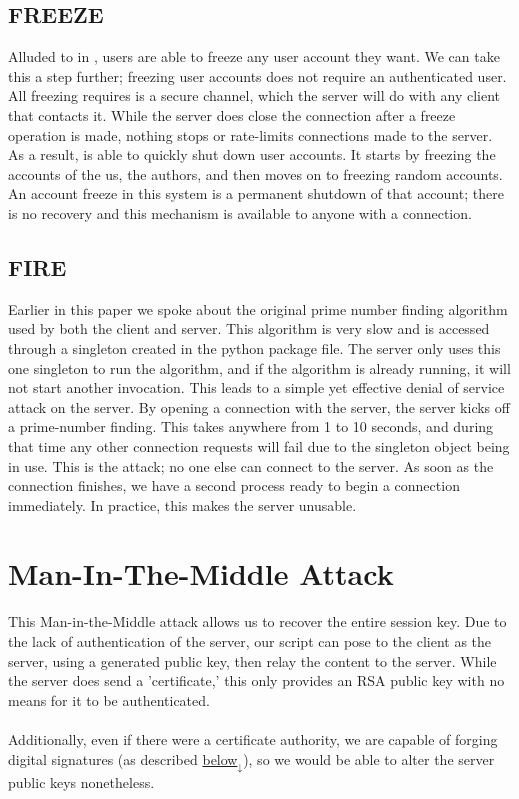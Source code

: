 \documentclass{article}
\newcommand{\code}[1]{\tcbox[
    on line,
    colback=codebackground, boxsep=2pt,
    colframe=white, boxrule=0pt,
    top=0pt, bottom=0pt, left=0pt, right=0pt
]{\texttt{#1}}}
\begin{document}
\subsection{FREEZE}
Alluded to in \code{FRAUDCLIENT}, users are able to freeze any user account they want. We can take this a step further; freezing user accounts does not require an authenticated user. All freezing requires is a secure channel, which the server will do with any client that contacts it. While the server does close the connection after a freeze operation is made, nothing stops or rate-limits connections made to the server.
As a result, \code{FREEZE} is able to quickly shut down user accounts. It starts by freezing the accounts of the us, the authors, and then moves on to freezing random accounts. An account freeze in this system is a permanent shutdown of that account; there is no recovery and this mechanism is available to anyone with a connection.

\subsection{FIRE}
Earlier in this paper we spoke about the original prime number finding algorithm used by both the client and server. This algorithm is very slow and is accessed through a singleton created in the python package file. The server only uses this one singleton to run the algorithm, and if the algorithm is already running, it will not start another invocation. This leads to a simple yet effective denial of service attack on the server.
By opening a connection with the server, the server kicks off a prime-number finding. This takes anywhere from 1 to 10 seconds, and during that time any other connection requests will fail due to the singleton object being in use.
This is the attack; no one else can connect to the server. As soon as the connection finishes, we have a second process ready to begin a connection immediately. In practice, this makes the server unusable.

\section{Man-In-The-Middle Attack}
This Man-in-the-Middle attack allows us to recover the entire session key.
Due to the lack of authentication of the server, our script can pose to the client as the server,
using a generated public key, then relay the content to the server.
While the server does send a 'certificate,' this only provides an RSA public key with no means for it to be authenticated. \\
\\
Additionally, even if there were a certificate authority, we are capable of forging digital signatures
(as described \hyperref[sec:signaturebad]{below$_\downarrow$}), so we would be able to alter the server public keys nonetheless.
\end{document}
